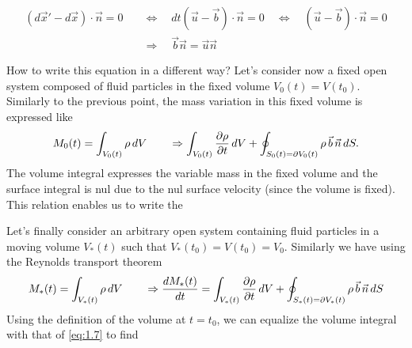 	\begin{equation}
	\begin{aligned}
		(d\vec{x}'-d\vec{x})\cdot \vec{n} = 0 \quad &\Leftrightarrow \quad dt (\vec{u}-\vec{b})\cdot \vec{n} = 0 \quad \Leftrightarrow \quad (\vec{u}-\vec{b})\cdot \vec{n} = 0 \\
		&\Rightarrow \quad \vec{b} \vec{n} = \vec{u} \vec{n}
		\end{aligned}
	\end{equation}
	\begin{center}
	\end{center}
	
	How to write this equation in a different way? Let's consider now a fixed open system composed of fluid particles in the fixed volume $V_0(t) = V(t_0)$. Similarly to the previous point, the mass variation in this fixed volume is expressed like 
	\begin{equation}
		M_0(t) = \int _{V_0(t)} \rho\, dV \qquad 
		\Rightarrow \int _{V_0(t)} \frac{\D \rho}{\D t}\, dV + \oint _{S_0(t) = \D V_0(t)} \rho\, \vec{b}\, \vec{n}\, dS.
	\end{equation}
	The volume integral expresses the variable mass in the fixed volume and the surface integral is nul due to the nul surface velocity (since the volume is fixed). This relation enables us to write the 
	\begin{center}
	\end{center}	
	Let's finally consider an arbitrary open system containing fluid particles in a moving volume $V_*(t)$ such that $V_*(t_0) = V(t_0) = V_0$. Similarly we have using the Reynolds transport theorem
	\begin{equation}
		M_*(t) = \int _{V_*(t)} \rho\, dV \qquad \Rightarrow \frac{dM_*(t)}{dt} = \int _{V_*(t)} \frac{\D \rho}{\D t}\, dV + \oint _{S_*(t) = \D V_*(t)} \rho\, \vec{b}\, \vec{n}\, dS
	\end{equation}
	Using the definition of the volume at $t=t_0$, we can equalize the volume integral with that of \autoref{eq:1.7} to find 
	\begin{center}
	\end{center}	
	
